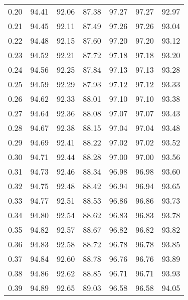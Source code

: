 \begin{tabular}{|c|c|c|c|c|c|c|}
      0.20 &     94.41 &     92.06 &      87.38 &   97.27 &      97.27 &         92.97 \\
      0.21 &     94.45 &     92.11 &      87.49 &   97.26 &      97.26 &         93.04 \\
      0.22 &     94.48 &     92.15 &      87.60 &   97.20 &      97.20 &         93.12 \\
      0.23 &     94.52 &     92.21 &      87.72 &   97.18 &      97.18 &         93.20 \\
      0.24 &     94.56 &     92.25 &      87.84 &   97.13 &      97.13 &         93.28 \\
      0.25 &     94.59 &     92.29 &      87.93 &   97.12 &      97.12 &         93.33 \\
      0.26 &     94.62 &     92.33 &      88.01 &   97.10 &      97.10 &         93.38 \\
      0.27 &     94.64 &     92.36 &      88.08 &   97.07 &      97.07 &         93.43 \\
      0.28 &     94.67 &     92.38 &      88.15 &   97.04 &      97.04 &         93.48 \\
      0.29 &     94.69 &     92.41 &      88.22 &   97.02 &      97.02 &         93.52 \\
      0.30 &     94.71 &     92.44 &      88.28 &   97.00 &      97.00 &         93.56 \\
      0.31 &     94.73 &     92.46 &      88.34 &   96.98 &      96.98 &         93.60 \\
      0.32 &     94.75 &     92.48 &      88.42 &   96.94 &      96.94 &         93.65 \\
      0.33 &     94.77 &     92.51 &      88.53 &   96.86 &      96.86 &         93.73 \\
      0.34 &     94.80 &     92.54 &      88.62 &   96.83 &      96.83 &         93.78 \\
      0.35 &     94.82 &     92.57 &      88.67 &   96.82 &      96.82 &         93.82 \\
      0.36 &     94.83 &     92.58 &      88.72 &   96.78 &      96.78 &         93.85 \\
      0.37 &     94.84 &     92.60 &      88.78 &   96.76 &      96.76 &         93.89 \\
      0.38 &     94.86 &     92.62 &      88.85 &   96.71 &      96.71 &         93.93 \\
      0.39 &     94.89 &     92.65 &      89.03 &   96.58 &      96.58 &         94.05 \\

\end{tabular}
